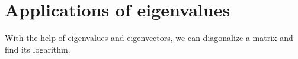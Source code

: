 \begin{example}



    
    

\end{example}


\newpage
\bigskip
\section{Applications of eigenvalues}
With the help of eigenvalues and eigenvectors, we can diagonalize a matrix and find its logarithm.

